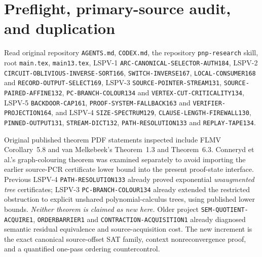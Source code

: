 \documentclass[11pt]{article}
\begin{document}
\section{Preflight, primary-source audit, and duplication}
Read original repository \texttt{AGENTS.md}, \texttt{CODEX.md}, the repository \texttt{pnp-research} skill, root \texttt{main.tex}, \texttt{main13.tex}, LSPV-1 \texttt{ARC-CANONICAL-SELECTOR-AUTH184}, LSPV-2 \texttt{CIRCUIT-OBLIVIOUS-INVERSE-SORT166}, \texttt{SWITCH-INVERSE167}, \texttt{LOCAL-CONSUMER168} and \texttt{RECORD-OUTPUT-SELECT169}, LSPV-3 \texttt{SOURCE-POINTER-STREAM131}, \texttt{SOURCE-PAIRED-AFFINE132}, \texttt{PC-BRANCH-COLOUR134} and \texttt{VERTEX-CUT-CRITICALITY134}, LSPV-5 \texttt{BACKDOOR-CAP161}, \texttt{PROOF-SYSTEM-FALLBACK163} and \texttt{VERIFIER-PROJECTION164}, and LSPV-4 \texttt{SIZE-SPECTRUM129}, \texttt{CLAUSE-LENGTH-FIREWALL130}, \texttt{PINNED-OUTPUT131}, \texttt{STREAM-DICT132}, \texttt{PATH-RESOLUTION133} and \texttt{REPLAY-TAPE134}.\par
Original published theorem PDF statements inspected include FLMV Corollary~5.8 and van Melkebeek's Theorem~1.3 and Theorem~6.3. Conneryd et al.'s graph-colouring theorem was examined separately to avoid importing the earlier source-PCR certificate lower bound into the present proof-state interface. Previous LSPV-4 \texttt{PATH-RESOLUTION133} already proved exponential \emph{unaugmented tree} certificates; LSPV-3 \texttt{PC-BRANCH-COLOUR134} already extended the restricted obstruction to explicit unshared polynomial-calculus trees, using published lower bounds. \emph{Neither theorem is claimed as new here.} Older project \texttt{SEM-QUOTIENT-ACQUIRE1}, \texttt{ORDERBARRIER1} and \texttt{CONTRACTION-ACQUISITION1} already diagnosed semantic residual equivalence and source-acquisition cost. The new increment is the exact canonical source-offset SAT family, context nonreconvergence proof, and a quantified one-pass ordering countercontrol.
\end{document}
